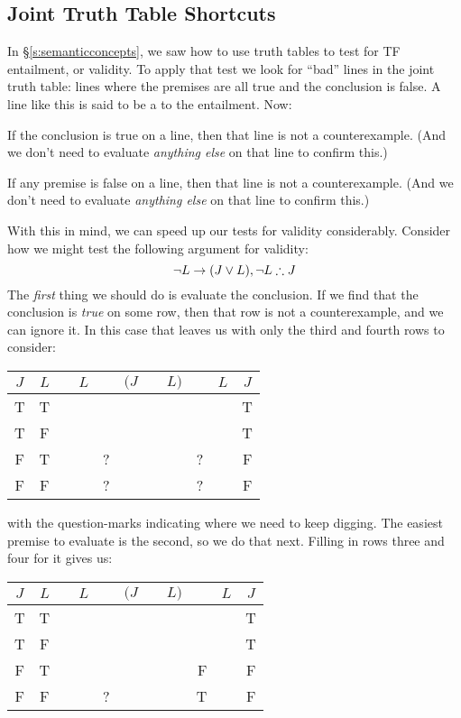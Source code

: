 \subsection{Joint Truth Table Shortcuts}
In \S\ref{s:semanticconcepts}, we saw how to use truth tables to test for TF entailment, or validity. To apply that test we look for ``bad'' lines in the joint truth table: lines where the premises are all true and the conclusion is false.  A line like this is said to be a  to the entailment. Now:\begin{earg}
	\item[\textbullet] If the conclusion is true on a line, then that line is not a counterexample. (And we don't need to evaluate \emph{anything else} on that line to confirm this.)
	\item[\textbullet] If any premise is false on a line, then that line is not a counterexample. (And we don't need to evaluate \emph{anything else} on that line to confirm this.)
\end{earg}
With this in mind, we can speed up our tests for validity considerably.  Consider how we might test the following argument for validity:
$$\neg L \rightarrow (J \vee L), \neg L \therefore J$$
The \emph{first} thing we should do is evaluate the conclusion. If we find that the conclusion is \emph{true} on some row, then that row is not a counterexample, and we can ignore it. In this case that leaves us with only the third and fourth rows to consider:
\begin{center}
	\begin{tabular}{c c|d e e e e f |d f|c}
		$J$&$L$&\enot&$L$&\eif&$(J$&\eor&$L)$&\enot&$L$&$J$\\
		\hline
		T & T & &&&&&&&& {T}\\
		T & F & &&&&&&&& {T}\\
		F & T & &&?&&&&?&& {F}\\
		F & F & &&?&&&&?&& {F}
	\end{tabular}
\end{center}
with the question-marks indicating where we need to keep digging. The easiest premise to evaluate is the second, so we do that next.  Filling in rows three and four for it gives us:
\begin{center}
	\begin{tabular}{c c|d e e e e f |d f|c}
		$J$&$L$&\enot&$L$&\eif&$(J$&\eor&$L)$&\enot&$L$&$J$\\
		\hline
		T & T & &&&&&&&& {T}\\
		T & F & &&&&&&&& {T}\\
		F & T & &&&&&&{F}&& {F}\\
		F & F & &&?&&&&{T}&& {F}
	\end{tabular}
\end{center}
